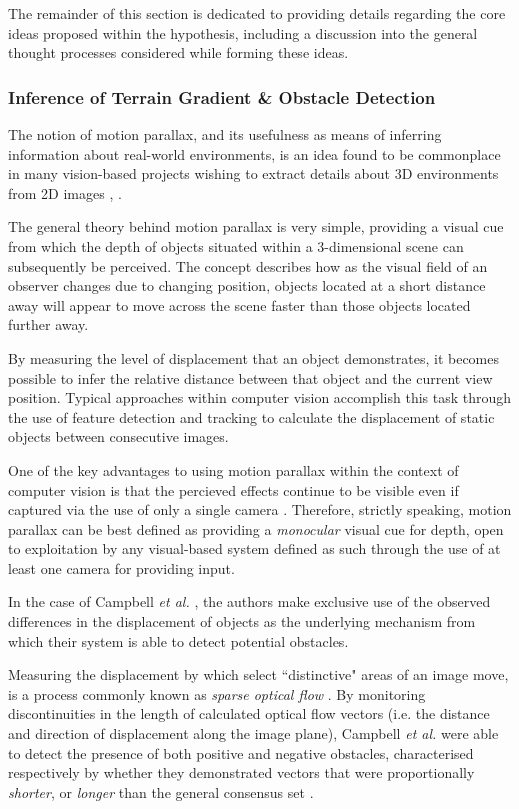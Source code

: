 The remainder of this section is dedicated to providing details regarding the core ideas proposed within the hypothesis, including a discussion into the general thought processes considered while forming these ideas.

\subsubsection{Inference of Terrain Gradient \& Obstacle Detection}

The notion of motion parallax, and its usefulness as means of inferring information about real-world environments, is an idea found to be commonplace in many vision-based projects wishing to extract details about 3D environments from 2D images \cite{}, \cite{}.  

The general theory behind motion parallax is very simple, providing a visual cue from which the depth of objects situated within a 3-dimensional scene can subsequently be perceived. The concept describes how as the visual field of an observer changes due to changing position, objects located at a short distance away will appear to move across the scene faster than those objects located further away.
 
 By measuring the level of displacement that an object demonstrates, it becomes possible to infer the relative distance between that object and the current view position. Typical approaches within computer vision accomplish this task through the use of feature detection and tracking to calculate the displacement of static objects between consecutive images. 
 
One of the key advantages to using motion parallax within the context of computer vision is that the percieved effects continue to be visible even if captured via the use of only a single camera \cite{}. Therefore, strictly speaking, motion parallax can be best defined as providing a \textit{monocular} visual cue for depth, open to exploitation by any visual-based system defined as such through the use of at least one camera for providing input.

In the case of Campbell \textit{et al.} \cite{campbell}, the authors make exclusive use of the observed differences in the displacement of objects as the underlying mechanism from which their system is able to detect potential obstacles. 

Measuring the displacement by which select ``distinctive" areas of an image move, is a process commonly known as \textit{sparse optical flow} \cite{sparse-optical-flow}. By monitoring discontinuities in the length of calculated optical flow vectors (i.e. the distance and direction of displacement along the image plane), Campbell \textit{et al.} were able to detect the presence of both positive and negative obstacles, characterised respectively by whether they demonstrated vectors that were proportionally \textit{shorter}, or \textit{longer} than the general consensus set \cite{campbell}.

